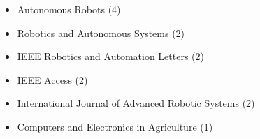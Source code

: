 \begin{itemize}
	\item Autonomous Robots (4)
	\item Robotics and Autonomous Systems (2)
	\item IEEE Robotics and Automation Letters (2)
	\item IEEE Access (2)
	\item International Journal of Advanced Robotic Systems (2)
	\item Computers and Electronics in Agriculture (1)
\end{itemize}